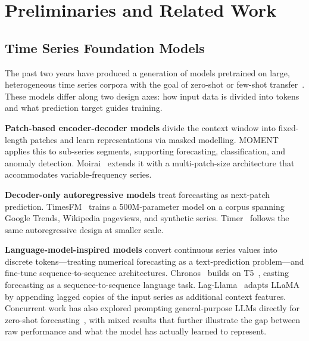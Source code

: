 
\section{Preliminaries and Related Work}
\label{sec:related}

\subsection{Time Series Foundation Models}
\label{sec:rel_tsfm}

The past two years have produced a generation of models pretrained on large,
heterogeneous time series corpora with the goal of zero-shot or few-shot
transfer~\cite{jin2023large,liang2024foundation}.
These models differ along two design axes: how input data is divided into
tokens and what prediction target guides training.

\textbf{Patch-based encoder-decoder models} divide the context window into
fixed-length patches and learn representations via masked modelling.
MOMENT~\cite{goswami2024moment} applies this to sub-series segments,
supporting forecasting, classification, and anomaly detection.
Moirai~\cite{woo2024moirai} extends it with a multi-patch-size architecture
that accommodates variable-frequency series.

\textbf{Decoder-only autoregressive models} treat forecasting as next-patch
prediction.
TimesFM~\cite{das2024timesfm} trains a 500M-parameter model on a corpus
spanning Google Trends, Wikipedia pageviews, and synthetic series.
Timer~\cite{liu2024timer} follows the same autoregressive design at smaller
scale.

\textbf{Language-model-inspired models} convert continuous series values into
discrete tokens---treating numerical forecasting as a text-prediction problem---and
fine-tune sequence-to-sequence architectures.
Chronos~\cite{ansari2024chronos} builds on T5~\cite{raffel2020t5}, casting
forecasting as a sequence-to-sequence language task.
Lag-Llama~\cite{rasul2024lagllama} adapts LLaMA by appending lagged copies of
the input series as additional context features.
Concurrent work has also explored prompting general-purpose LLMs directly for
zero-shot forecasting~\cite{gruver2023llmts}, with mixed results that further illustrate the gap between raw performance and
what the model has actually learned to represent.


